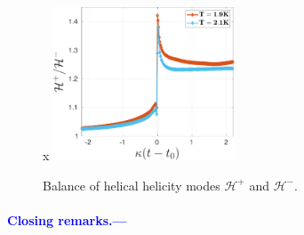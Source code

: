 \documentclass[%
 reprint,
 amsmath,amssymb,
 aps,
 prl,
]{revtex4-2}
\def\blue#1{\textcolor{blue}{#1}}
\begin{document}
\begin{figure}x
    \centering
    \includegraphics*[width=0.48\textwidth]{hel-decomp.pdf}
    \caption{Balance of helical helicity modes $\mathcal{H}^+$ and $\mathcal{H}^-$. }
    \label{fig:helicity-modes}
\end{figure}
\blue{
\paragraph*{Closing remarks.---}\blindtext
}

\end{document}
